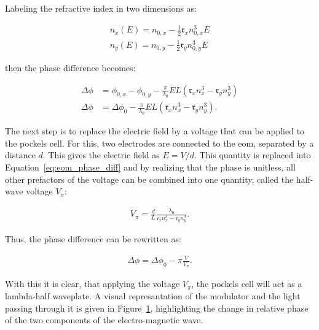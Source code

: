 Labeling the refractive index in two dimensions as:

\begin{align}
	n_x(E) = n_{0,x} - \frac{1}{2} \mathfrak{r}_x n_{0,x}^3 E \\
	n_y(E) = n_{0,y} - \frac{1}{2} \mathfrak{r}_y n_{0,y}^3 E
\end{align}

then the phase difference becomes:

\begin{align}
	\Delta \phi & = \phi_{0,x} - \phi_{0,y} - \frac{\pi}{\lambda_0} E L \left(\mathfrak{r}_x n_x^3 - \mathfrak{r}_y n_y^3\right) \\
	\Delta \phi & = \Delta \phi_{0} - \frac{\pi}{\lambda_0} E L \left(\mathfrak{r}_x n_x^3 - \mathfrak{r}_y n_y^3\right).
	\label{eq:eom_phase_diff}
\end{align}

\begin{figure}[t]%
\label{fig:eom_schem}
\end{figure}

The next step is to replace the electric field by a voltage that can be applied to the pockels cell. For this, two electrodes are connected to the \ac{eom}, separated by a distance $d$. This gives the electric field as $E=V/d$. This quantity is replaced into Equation~\ref{eq:eom_phase_diff} and by realizing that the phase is unitless, all other prefactors of the voltage can be combined into one quantity, called the half-wave voltage $V_\pi$:

\begin{align}
	V_\pi = \frac{d}{L} \frac{\lambda_0}{\mathfrak{r}_x n_x^3 - \mathfrak{r}_y n_y^3}.
\end{align}

Thus, the phase difference can be rewritten as:

\begin{align}
	\label{eq:eom_phase_diff}
	\Delta \phi = \Delta \phi_0 - \pi \frac{V}{V_\pi}.
\end{align}

With this it is clear, that applying the voltage $V_\pi$, the pockels cell will act as a lambda-half waveplate. A visual represantation of the modulator and the light passing through it is given in Figure~\ref{fig:eom_schem}, highlighting the change in relative phase of the two components of the electro-magnetic wave.

